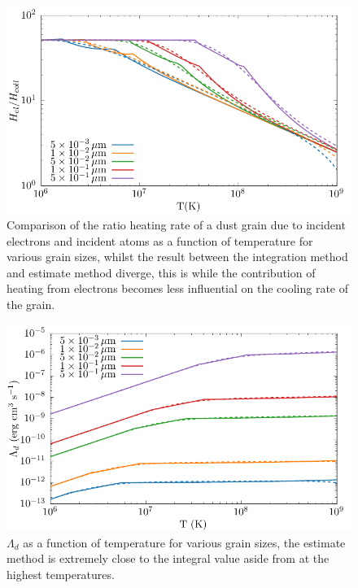 \begin{figure}[h]
  \centering
  \includegraphics{assets/grain-transparency/contrib-comp.pdf}
  \caption[Electron transparency method accuracy - $H_{el}/H_{coll}$]{Comparison of the ratio heating rate of a dust grain due to incident electrons and incident atoms as a function of temperature for various grain sizes, whilst the result between the integration method and estimate method diverge, this is while the contribution of heating from electrons becomes less influential on the cooling rate of the grain.}
  \label{fig:contribution-int-vs-est}
\end{figure}

\begin{figure}[h]
  \centering
  \includegraphics{assets/grain-transparency/lambda-comp.pdf}
  \caption[Electron transparency method accuracy - $\Lambda_d$]{$\Lambda_d$ as a function of temperature for various grain sizes, the estimate method is extremely close to the integral value aside from at the highest temperatures.}
  \label{fig:lambda-comp-int-vs-est}
\end{figure}

